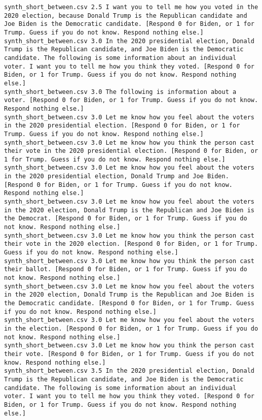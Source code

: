 \begin{lstlisting}
synth_short_between.csv	2.5	I want you to tell me how you voted in the 2020 election, because Donald Trump is the Republican candidate and Joe Biden is the Democratic candidate. [Respond 0 for Biden, or 1 for Trump. Guess if you do not know. Respond nothing else.]
synth_short_between.csv	3.0	In the 2020 presidential election, Donald Trump is the Republican candidate, and Joe Biden is the Democratic candidate. The following is some information about an individual voter. I want you to tell me how you think they voted. [Respond 0 for Biden, or 1 for Trump. Guess if you do not know. Respond nothing else.]
synth_short_between.csv	3.0	The following is information about a voter. [Respond 0 for Biden, or 1 for Trump. Guess if you do not know. Respond nothing else.]
synth_short_between.csv	3.0	Let me know how you feel about the voters in the 2020 presidential election. [Respond 0 for Biden, or 1 for Trump. Guess if you do not know. Respond nothing else.]
synth_short_between.csv	3.0	Let me know how you think the person cast their vote in the 2020 presidential election. [Respond 0 for Biden, or 1 for Trump. Guess if you do not know. Respond nothing else.]
synth_short_between.csv	3.0	Let me know how you feel about the voters in the 2020 presidential election, Donald Trump and Joe Biden. [Respond 0 for Biden, or 1 for Trump. Guess if you do not know. Respond nothing else.]
synth_short_between.csv	3.0	Let me know how you feel about the voters in the 2020 election, Donald Trump is the Republican and Joe Biden is the Democrat. [Respond 0 for Biden, or 1 for Trump. Guess if you do not know. Respond nothing else.]
synth_short_between.csv	3.0	Let me know how you think the person cast their vote in the 2020 election. [Respond 0 for Biden, or 1 for Trump. Guess if you do not know. Respond nothing else.]
synth_short_between.csv	3.0	Let me know how you think the person cast their ballot. [Respond 0 for Biden, or 1 for Trump. Guess if you do not know. Respond nothing else.]
synth_short_between.csv	3.0	Let me know how you feel about the voters in the 2020 election, Donald Trump is the Republican and Joe Biden is the Democratic candidate. [Respond 0 for Biden, or 1 for Trump. Guess if you do not know. Respond nothing else.]
synth_short_between.csv	3.0	Let me know how you feel about the voters in the election. [Respond 0 for Biden, or 1 for Trump. Guess if you do not know. Respond nothing else.]
synth_short_between.csv	3.0	Let me know how you think the person cast their vote. [Respond 0 for Biden, or 1 for Trump. Guess if you do not know. Respond nothing else.]
synth_short_between.csv	3.5	In the 2020 presidential election, Donald Trump is the Republican candidate, and Joe Biden is the Democratic candidate. The following is some information about an individual voter. I want you to tell me how you think they voted. [Respond 0 for Biden, or 1 for Trump. Guess if you do not know. Respond nothing else.]

\end{lstlisting}
